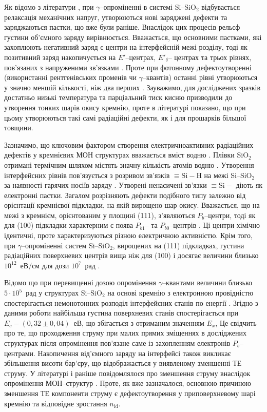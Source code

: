 Як відомо з літератури \cite{PersenkovBook}, при $\gamma$--опроміненні в системі Si--SiO$_2$
відбувається релаксація механічних напруг,
утворюються нові заряджені дефекти та заряджаються пастки, що вже були раніше.
Внаслідок цих процесів рельєф густини об'ємного заряду вирівнюється.
Вважається, що основними пастками, які захоплюють негативний заряд є центри на інтерфейсній межі розділу,
тоді як позитивний заряд накопичується на $E'$--центрах, $E'_\delta$-- центрах та трьох рівнях, пов'язаних
з напруженими зв'язками \cite{SiO2:Devine,SiO2:Lenahan}.
Проте при фотонному дефектоутворенні (використанні рентгенівських променів чи $\gamma$--квантів) останні рівні утворюються у значно меншій кількості, ніж два перших \cite{SiO2:Devine}.
Зауважимо, для досліджених зразків достатньо низькі температура та парціальний тиск кисню призводили до утворення тонких шарів окису кремнію, проте в літературі \cite{SiO2:Cantin} показано, що при цьому утворюються такі самі радіаційні дефекти, як і для прошарків більшої товщини.

Зазначимо, що ключовим фактором створення електричноактивних радіаційних дефектів у кремнієвих МОН структурах вважається вміст водню \cite{SiO2:Cantin}.
Плівки SiO$_2$ отримані термічним шляхом містять значну кількість атомів водню \cite{PersenkovBook}.
Утворення інтерфейсних рівнів пов'язується з розривом зв'язків $\equiv\!\text{Si}\!-\!\text{H}$ на межі Si--SiO$_2$ за наявності гарячих носіїв заряду \cite{SiO2:Mahapatra,SiO2:Esseni}.
Утворені ненасичені зв'язки $\equiv\text{Si}-$  діють як електронні пастки.
Загалом розрізняють дефекти подібного типу залежно від орієнтації кремнієвої підкладки, на якій вирощено шар окису.
Вважається, що на межі з кремнієм, орієнтованим у площині (111), з'являються $P_b$--центри, тоді
як для (100) підкладки характерним є поява $P_{b1}$-- та $P_{b0}$--центрів \cite{SiO2:Rev}.
Ці центри хімічно ідентичні, проте характеризуються різною електричною активністю.
Крім того, при $\gamma$--опроміненні систем Si--SiO$_2$, вирощених на (111) підкладках, густина радіаційних поверхневих центрів вища ніж для (100) і досягає величини близько $10^{12}$~еВ/см для дози $10^{7}$~рад \cite{PersenkovBook}.

Відомо що при перевищенні дозою опромінення $\gamma$--квантами величини близько $5\cdot10^5$~рад у структурах Si--SiO$_2$ на основі кремнію з електронною провідністю спостерігається немонотонних розподіл інтерфейсних станів по енергії \cite{PersenkovBook}.
Згідно з даними роботи \cite{ParchSiO2} найбільша густина поверхневих станів спостерігається при
$E_c-(0,32\pm0,04)$~еВ, що збігається з отриманим значенням $E_x$,
Це свідчить про те, що проходження струму при малих прямих зміщеннях в досліджених структурах після опромінення пов'язане саме із захопленням електронів $P_b$--центрами.
Накопичення від'ємного заряду на інтерфейсі також викликає збільшення висоти бар'єру,
що відображається у виявленому зменшенні ТЕ струму.
У літературі і раніше повідомлялося про зменшення струму внаслідок опромінення МОН--структур \cite{SiO2:Niu}.
Проте, як вже зазначалося, основною причиною зменшення ТЕ компоненти струму є дефектоутворення у приповерхневому шарі кремнію та відповідне зростання $n_\mathrm{id}$.

